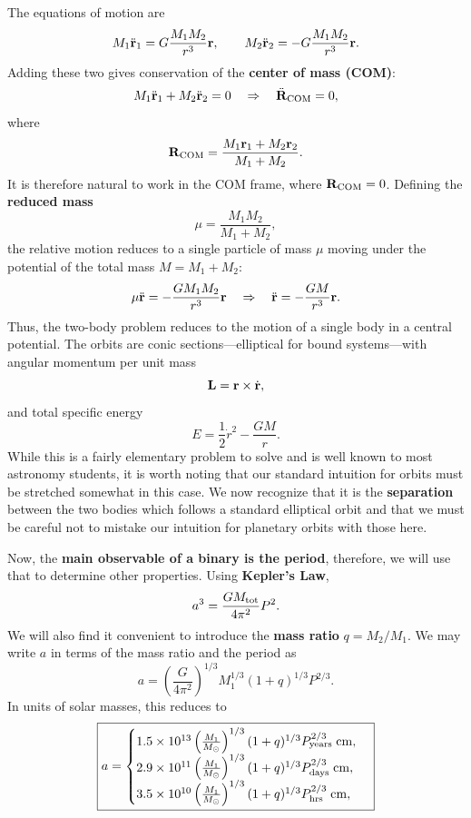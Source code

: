 The equations of motion are
\[
M_1 \ddot{\bf r}_1 = G \frac{M_1 M_2}{r^3} {\bf r}, 
\qquad
M_2 \ddot{\bf r}_2 = -G \frac{M_1 M_2}{r^3} {\bf r}.
\]
Adding these two gives conservation of the \textbf{center of mass (COM)}:
\[
M_1 \ddot{\bf r}_1 + M_2 \ddot{\bf r}_2 = 0 
\quad \Rightarrow \quad 
\ddot{\bf R}_{\rm COM} = 0,
\]
where 
\[
{\bf R}_{\rm COM} = \frac{M_1 {\bf r}_1 + M_2 {\bf r}_2}{M_1 + M_2}.
\]
It is therefore natural to work in the COM frame, where ${\bf R}_{\rm COM} = 0$.  
Defining the \textbf{reduced mass} 
\[
\mu = \frac{M_1 M_2}{M_1 + M_2},
\]
the relative motion reduces to a single particle of mass $\mu$ moving under the potential of the total mass $M = M_1 + M_2$:
\[
\mu \ddot{\bf r} = - \frac{G M_1 M_2}{r^3} {\bf r}
\quad \Rightarrow \quad 
\ddot{\bf r} = - \frac{G M}{r^3} {\bf r}.
\]
Thus, the two-body problem reduces to the motion of a single body in a central potential.  
The orbits are conic sections—elliptical for bound systems—with angular momentum per unit mass
\[
{\bf L} = {\bf r} \times \dot{\bf r},
\]
and total specific energy
\[
E = \frac{1}{2}\dot{r}^2 - \frac{GM}{r}.
\]
While this is a fairly elementary problem to solve and is well known to most astronomy students, it is worth noting that our standard intuition for orbits must be stretched somewhat in this case. We now recognize that it is the \textbf{separation} between the two bodies which follows a standard elliptical orbit and that we must be careful not to mistake our intuition for planetary orbits with those here.
\par
Now, the \textbf{main observable of a binary is the period}, therefore, we will use that to determine other properties. Using \textbf{Kepler's Law},
\[
a^3 = \frac{GM_{\rm tot}}{4\pi^2} P^2.
\]
We will also find it convenient to introduce the \textbf{mass ratio} $q = M_2/M_1$. We may write $a$ in terms of the mass ratio and the period as
\begin{equation}
\label{eq:binary_orbit_semi_major_axis}
\boxed{
    a = \left(\frac{G}{4\pi^2}\right)^{1/3} M_1^{1/3}(1+q)^{1/3} P^{2/3}.
}
\end{equation}
In units of solar masses, this reduces to
\begin{equation}
    \label{eq:binary_orbit_semi_major_axis_united}
    \boxed{
    a = \begin{cases}
        1.5\times 10^{13} \left(\frac{M_1}{M_\odot}\right)^{1/3} (1+q)^{1/3} P_{\rm years}^{2/3}\; {\rm cm},&\\
                2.9\times 10^{11} \left(\frac{M_1}{M_\odot}\right)^{1/3} (1+q)^{1/3} P_{\rm days}^{2/3}\; {\rm cm},&\\
                        3.5\times10^{10} \left(\frac{M_1}{M_\odot}\right)^{1/3} (1+q)^{1/3} P_{\rm hrs}^{2/3}\; {\rm cm},&\\
    \end{cases}
    }
\end{equation}

